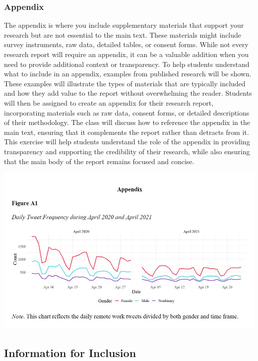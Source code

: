 \documentclass[
]{book}
\begin{document}
\subsubsection*{Appendix}\label{appendix}

The appendix is where you include supplementary materials that support your research but are not essential to the main text. These materials might include survey instruments, raw data, detailed tables, or consent forms. While not every research report will require an appendix, it can be a valuable addition when you need to provide additional context or transparency. To help students understand what to include in an appendix, examples from published research will be shown. These examples will illustrate the types of materials that are typically included and how they add value to the report without overwhelming the reader. Students will then be assigned to create an appendix for their research report, incorporating materials such as raw data, consent forms, or detailed descriptions of their methodology. The class will discuss how to reference the appendix in the main text, ensuring that it complements the report rather than detracts from it. This exercise will help students understand the role of the appendix in providing transparency and supporting the credibility of their research, while also ensuring that the main body of the report remains focused and concise.

\includegraphics[width=1\textwidth,height=\textheight]{images/fig086.jpg}

\subsection*{Information for Inclusion}\label{information-for-inclusion}
\end{document}
